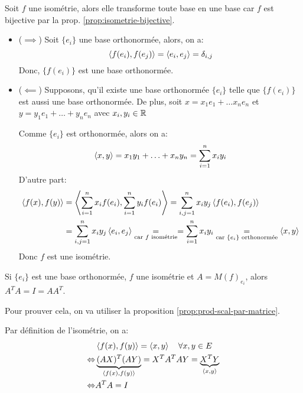\begin{preuve}
    Soit $f$ une isométrie, alors elle transforme toute base en une base car  $f$ est bijective par la prop. \ref{prop:isometrie-bijective}. 
    \begin{itemize}
        \item ($\implies$) Soit $\{e_i\}$ une base orthonormée, alors, on a:
             \[
                 \left\langle f(e_i), f(e_j) \right\rangle = \left\langle e_i, e_j \right\rangle = \delta_{i,j}
            \] 
            Donc, $\{f(e_i)\}$ est une base orthonormée.
        \item ($\impliedby$) Supposons, qu'il existe une base orthonormée $\{e_i\}$ telle que  $\{f(e_i)\}$ est aussi une base orthonormée. De plus, soit  $x = x_1e_1 + \ldots x_ne_n$ et $y = y_1e_1 + \ldots + y_ne_n$ avec $x_i, y_i \in \mathbb{R}$
            \par
            Comme $\{e_i\}$ est orthonormée, alors on a:
             \[
                 \left\langle x, y \right\rangle = x_1y_1 + \ldots + x_ny_n = \sum_{i=1}^{n} x_iy_i
            \] 
            D'autre part:
            \begin{align*}
                \left\langle f(x), f(y) \right\rangle &= \left\langle \sum_{i=1}^{n} x_if(e_i), \sum_{i=1}^{n} y_if(e_i) \right\rangle = \sum_{i,j = 1}^{n} x_iy_j\left\langle f(e_i), f(e_j) \right\rangle\\
                                     &= \sum_{i,j=1}^{n} x_iy_j\left\langle e_i, e_j \right\rangle \underset{\text{car } f \text{ isométrie}}{=} = \sum_{i=1}^{n} x_iy_i \underset{\text{car } \{e_i\} \text{ orthonormée}} = \left\langle x, y \right\rangle
            \end{align*}
            Donc $f$ est une isométrie.
    \end{itemize}
\end{preuve}
\begin{prop}\label{prop:isometrie-ata-eg-i}
    Si $\{e_i\}$ est une base orthonormée, $f$ une isométrie et  $A = M(f)_{e_i}$, alors  $A^{T}A = I = AA^{T}$.
\end{prop}
\begin{preuve}
    Pour prouver cela, on va utiliser la proposition \ref{prop:prod-scal-par-matrice}. 
    \par
    Par définition de l'isométrie, on a:
    \begin{align*}
        &\left\langle f(x), f(y) \right\rangle = \left\langle x, y \right\rangle \quad \forall x, y \in E\\
        \Leftrightarrow &\underbrace{ (AX)^{T}(AY) }_{\left\langle f(x), f(y) \right\rangle} = X^TA^TAY = \underbrace{X^TY}_{\left\langle x, y \right\rangle}\\
        \Leftrightarrow &A^TA = I
    \end{align*}
\end{preuve}
